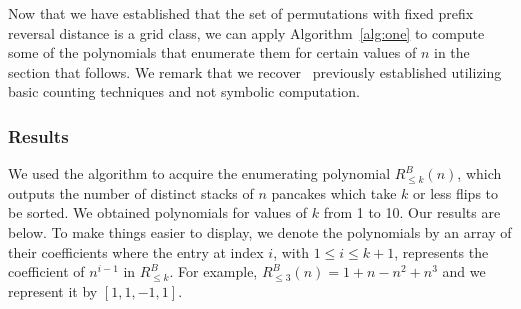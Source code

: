 \documentclass{article}
\numberwithin{equation}{section}
\theoremstyle{definition}
\begin{document}
Now that we have established that the set of permutations with fixed prefix reversal distance is a grid class, we can apply Algorithm~\ref{alg:one} to compute some of the polynomials that enumerate them for certain values of $n$ in the section that follows. We remark that we recover~\cite[Theorem 4.3]{BBP19Perm} previously established utilizing basic counting techniques and not symbolic computation. 

\subsubsection{Results}

We used the algorithm to acquire the enumerating polynomial $R^{B}_{\leq k}(n)$, which outputs the number of distinct stacks of $n$ pancakes which take $k$ or less flips to be sorted.  We obtained polynomials for values of $k$ from 1 to 10.  Our results are below. To make things easier to display, we denote the polynomials by an array of their coefficients where the entry at index $i$, with $1\leq i\leq k+1$, represents the coefficient of $n^{i-1}$ in $R^B_{\leq k}$. For example, $R^{B}_{\leq 3}(n) =  1+n-n^2+n^3$ and we represent it by $[1,1,-1,1]$.
\end{document}
